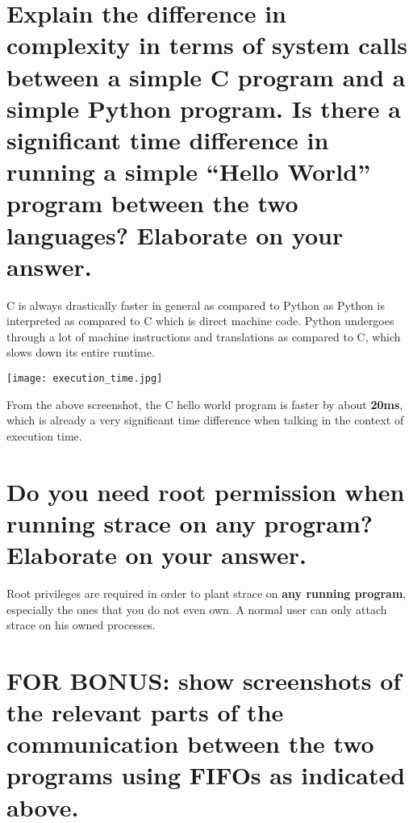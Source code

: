 \documentclass[conference]{IEEEtran}
\newcommand\tab[1][0.5cm]{\hspace*{#1}}
\begin{document}
\section{Explain the difference in complexity in terms of system calls between a simple
C program and a simple Python program. Is there a significant time difference
in running a simple “Hello World” program between the two languages?
Elaborate on your answer.}
C is always drastically faster in general as compared to Python as Python is interpreted as compared to C which is direct machine code. Python undergoes through a lot of machine instructions and translations as compared to C, which slows down its entire runtime.
\begin{center}
\texttt{[image: execution\_time.jpg]}
\end{center}
\tab From the above screenshot, the C hello world program is faster by about \textbf{20ms}, which is already a very significant time difference when talking in the context of execution time.

\section{Do you need root permission when running strace on any program? Elaborate
on your answer.}
Root privileges are required in order to plant strace on \textbf{any running program}, especially the ones that you do not even own. A normal user can only attach strace on his owned processes.

\section{FOR BONUS: show screenshots of the relevant parts of the communication
between the two programs using FIFOs as indicated above.}
\end{document}

